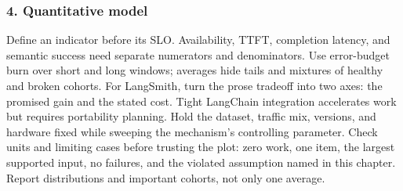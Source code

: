\subsubsection*{4. Quantitative model}
Define an indicator before its SLO. Availability, TTFT, completion latency, and semantic success need separate numerators and denominators. Use error-budget burn over short and long windows; averages hide tails and mixtures of healthy and broken cohorts.
For LangSmith, turn the prose tradeoff into two axes: the promised gain and the stated cost. Tight LangChain integration accelerates work but requires portability planning. Hold the dataset, traffic mix, versions, and hardware fixed while sweeping the mechanism's controlling parameter.
Check units and limiting cases before trusting the plot: zero work, one item, the largest supported input, no failures, and the violated assumption named in this chapter. Report distributions and important cohorts, not only one average.
